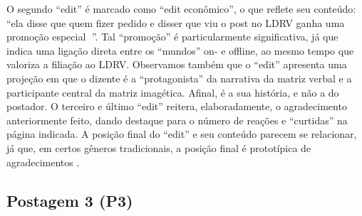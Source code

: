 \documentclass{textolivre}
\begin{document}
O segundo “edit” é marcado como “edit econômico”, o que reflete seu conteúdo: “ela disse que quem fizer pedido e disser que viu o post no LDRV ganha uma promoção especial {\Symbola 💖}”. Tal “promoção” é particularmente significativa, já que indica uma ligação direta entre os “mundos” on- e offline, ao mesmo tempo que valoriza a filiação ao LDRV. Observamos também que o “edit” apresenta uma projeção em que o dizente é a “protagonista” da narrativa da matriz verbal e a participante central da matriz imagética. Afinal, é a sua história, e não a do postador. O terceiro e último “edit” reitera, elaboradamente, o agradecimento anteriormente feito, dando destaque para o número de reações e “curtidas” na página indicada. A posição final do “edit” e seu conteúdo parecem se relacionar, já que, em certos gêneros tradicionais, a posição final é prototípica de agradecimentos \cite{henry2001}.

\subsection{Postagem 3 (P3)}\label{sec-postagem3}
\end{document}
